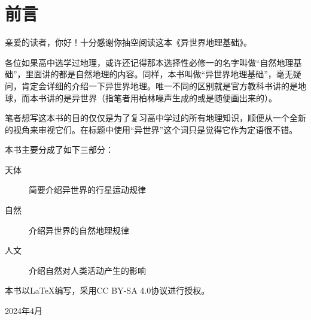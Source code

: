 \section*{前言}
亲爱的读者，你好！十分感谢你抽空阅读这本《异世界地理基础》。

各位如果高中选学过地理，或许还记得那本选择性必修一的名字叫做“自然地理基础”，里面讲的都是自然地理的内容。同样，本书叫做“异世界地理基础”，毫无疑问，肯定会详细的介绍一下异世界地理。唯一不同的区别就是官方教科书讲的是地球，而本书讲的是异世界（指笔者用柏林噪声生成的或是随便画出来的）。

笔者想写这本书的目的仅仅是为了复习高中学过的所有地理知识，顺便从一个全新的视角来审视它们。在标题中使用“异世界”这个词只是觉得它作为定语很不错。

本书主要分成了如下三部分：
\begin{description}
    \item[天体] 简要介绍异世界的行星运动规律
    \item[自然] 介绍异世界的自然地理规律
    \item[人文] 介绍自然对人类活动产生的影响
\end{description}

本书以\LaTeX 编写，采用CC BY-SA 4.0协议进行授权。

\begin{flushright}
    2024年4月
\end{flushright}
